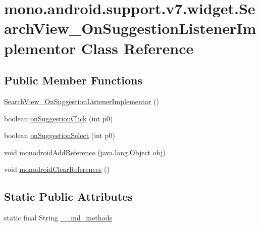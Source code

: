 \hypertarget{classmono_1_1android_1_1support_1_1v7_1_1widget_1_1_search_view___on_suggestion_listener_implementor}{
\section{mono.android.support.v7.widget.SearchView\_\-OnSuggestionListenerImplementor Class Reference}
\label{classmono_1_1android_1_1support_1_1v7_1_1widget_1_1_search_view___on_suggestion_listener_implementor}
}
\subsection*{Public Member Functions}
\begin{CompactItemize}
\item 
\hyperlink{classmono_1_1android_1_1support_1_1v7_1_1widget_1_1_search_view___on_suggestion_listener_implementor_7f3a6bc81cb826821afa38362bd1bd39}{SearchView\_\-OnSuggestionListenerImplementor} ()
\item 
boolean \hyperlink{classmono_1_1android_1_1support_1_1v7_1_1widget_1_1_search_view___on_suggestion_listener_implementor_df271189585405221f4ec0056022b836}{onSuggestionClick} (int p0)
\item 
boolean \hyperlink{classmono_1_1android_1_1support_1_1v7_1_1widget_1_1_search_view___on_suggestion_listener_implementor_edc377e3efa764d9a340e4fb489d95e7}{onSuggestionSelect} (int p0)
\item 
void \hyperlink{classmono_1_1android_1_1support_1_1v7_1_1widget_1_1_search_view___on_suggestion_listener_implementor_2b53b8bc0b5b5ea851eaf812bf3f33c1}{monodroidAddReference} (java.lang.Object obj)
\item 
void \hyperlink{classmono_1_1android_1_1support_1_1v7_1_1widget_1_1_search_view___on_suggestion_listener_implementor_18c038c967faebaff57c907d5d3d920b}{monodroidClearReferences} ()
\end{CompactItemize}
\subsection*{Static Public Attributes}
\begin{CompactItemize}
\item 
static final String \hyperlink{classmono_1_1android_1_1support_1_1v7_1_1widget_1_1_search_view___on_suggestion_listener_implementor_44a48ff09acbe6b4fd082f476212f5c7}{\_\-\_\-md\_\-methods}
\end{CompactItemize}
